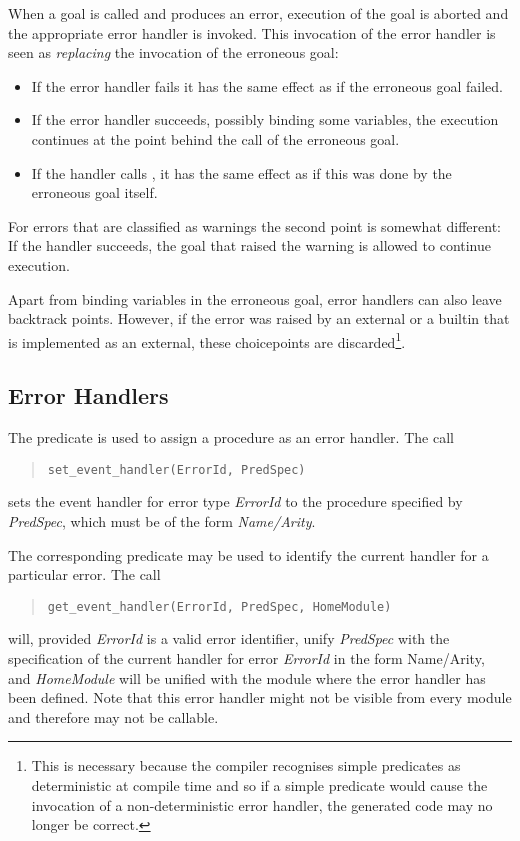 When a goal is called and produces an error, execution of the goal
is aborted and the appropriate error handler is invoked.
This invocation of the error handler is seen as {\it replacing}
the invocation of the erroneous goal:
\begin{itemize}
\item If the error handler fails it has the same effect as if the
erroneous goal failed.
\item If the error handler succeeds, possibly binding some variables,
the execution continues at the point behind the call of the erroneous goal.
\item If the handler calls , it has the same effect as if
this was done by the erroneous goal itself.
\end{itemize}
For errors that are classified as warnings the second point is somewhat
different: If the handler succeeds, the goal that raised the warning
is allowed to continue execution.

Apart from binding variables in the erroneous goal, error handlers can
also leave backtrack points. However, if the error was raised by
an external or a builtin that is implemented as an external, these
choicepoints are discarded\footnote{
This is necessary because the compiler recognises simple
predicates as deterministic at compile time and so if a
simple predicate would cause the invocation of a non-deterministic
error handler, the generated code may no longer be correct.}.


\subsection{Error Handlers}
The predicate  is used to assign a procedure as
an error handler. The call
\begin{quote}
\begin{verbatim}
set_event_handler(ErrorId, PredSpec)
\end{verbatim}
\end{quote}
sets the event handler for error type {\it ErrorId} to the procedure specified by
{\it PredSpec}, which must be of the form {\it Name/Arity}.

The corresponding predicate  may be used to identify
the current handler for a particular error. The call
\begin{quote}
\begin{verbatim}
get_event_handler(ErrorId, PredSpec, HomeModule)
\end{verbatim}
\end{quote}
will, provided {\it ErrorId} is a valid error identifier, unify {\it PredSpec} 
with the
specification of the current handler for error {\it ErrorId} in the form
Name/Arity, and {\it HomeModule} will be unified with the module where the
error handler has been defined. Note that this error handler might not be
visible from every module and therefore may not be callable.

